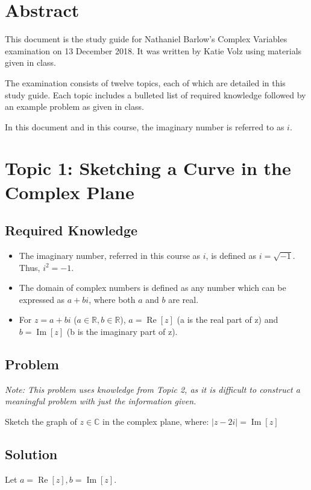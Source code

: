 \documentclass[12pt]{article}
\newcommand{\real}{\mathbb{R}}
\newcommand{\complex}{\mathbb{C}}
\renewcommand{\Re}{\operatorname{Re}}
\renewcommand{\Im}{\operatorname{Im}}
\begin{document}
\normalsize
\section {Abstract}
This document is the study guide for Nathaniel Barlow's Complex Variables examination on 13 December 2018.  It was written by Katie Volz using materials given in class.

The examination consists of twelve topics, each of which are detailed in this study guide.  Each topic includes a bulleted list of required knowledge followed by an example problem as given in class.

In this document and in this course, the imaginary number is referred to as $i$.

\section{Topic 1: Sketching a Curve in the Complex Plane}
\subsection{Required Knowledge}
\begin{itemize}
    \item The imaginary number, referred in this course as $i$, is defined as $i=\sqrt{-1}$.  Thus, $i^2=-1$.
    \item The domain of complex numbers is defined as any number which can be expressed as $a+bi$, where both $a$ and $b$ are real.
    \item For $z=a+bi$ ($a\in\real, b\in\real$), $a=\Re[z]$ (a is the real part of z) and $b=\Im[z]$ (b is the imaginary part of z).
\end{itemize}
\subsection{Problem}
\textit{Note: This problem uses knowledge from Topic 2, as it is difficult to construct a meaningful problem with just the information given.}

Sketch the graph of $z\in\complex$ in the complex plane, where:
$|z-2i|=\Im[z]$
\subsection{Solution}
Let $a=\Re[z], b=\Im[z]$.
\end{document}
